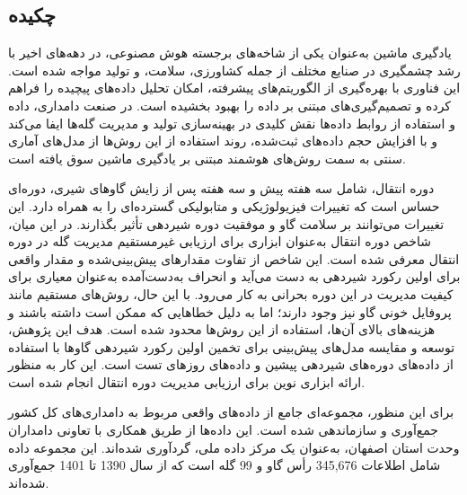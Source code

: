 

\setcounter{page}{1}
\thispagestyle{empty}


\subsection*{چکیده}
\begin{small}
\baselineskip=0.7cm

یادگیری ماشین به‌عنوان یکی از شاخه‌های برجسته هوش مصنوعی، در دهه‌های اخیر با رشد چشمگیری در صنایع مختلف از جمله کشاورزی، سلامت، و تولید مواجه شده است. این فناوری با بهره‌گیری از الگوریتم‌های پیشرفته، امکان تحلیل داده‌های پیچیده را فراهم کرده و تصمیم‌گیری‌های مبتنی بر داده را بهبود بخشیده است. در صنعت دامداری، داده و استفاده از روابط داده‌ها نقش کلیدی در بهینه‌سازی تولید و مدیریت گله‌ها ایفا می‌کند و با افزایش حجم داده‌های ثبت‌شده، روند استفاده از این روش‌ها از مدل‌های آماری سنتی به سمت روش‌های هوشمند مبتنی بر یادگیری ماشین سوق یافته است. 

دوره انتقال، شامل سه هفته پیش و سه هفته پس از زایش گاوهای شیری، دوره‌ای حساس است که تغییرات فیزیولوژیکی و متابولیکی گسترده‌ای را به همراه دارد. این تغییرات می‌توانند بر سلامت گاو و موفقیت دوره شیردهی تأثیر بگذارند. در این میان، شاخص دوره انتقال به‌عنوان ابزاری برای ارزیابی غیرمستقیم مدیریت گله در دوره انتقال معرفی شده است. این شاخص از تفاوت مقدارهای پیش‌بینی‌شده و مقدار واقعی برای اولین رکورد شیردهی به دست می‌آید و انحراف به‌دست‌آمده به‌عنوان معیاری برای کیفیت مدیریت در این دوره بحرانی به کار می‌رود. با این حال، روش‌های مستقیم مانند پروفایل خونی گاو نیز وجود دارند؛ اما به دلیل خطاهایی که ممکن است داشته باشند و هزینه‌های بالای آن‌ها، استفاده از این روش‌ها محدود شده است. هدف این پژوهش، توسعه و مقایسه مدل‌های پیش‌بینی برای تخمین اولین رکورد شیردهی گاوها با استفاده از داده‌های دوره‌های شیردهی پیشین و داده‌های روزهای تست است. این کار به منظور ارائه ابزاری نوین برای ارزیابی مدیریت دوره انتقال انجام شده است.

برای این منظور، مجموعه‌ای جامع از داده‌های واقعی مربوط به دامداری‌های کل کشور جمع‌آوری و سازماندهی شده است. این داده‌ها از طریق همکاری با تعاونی دامداران وحدت استان اصفهان، به‌عنوان یک مرکز داده ملی، گردآوری شده‌اند. این مجموعه داده شامل اطلاعات 345,676 رأس گاو و 99 گله است که از سال 1390 تا 1401 جمع‌آوری شده‌اند.


\end{small}
